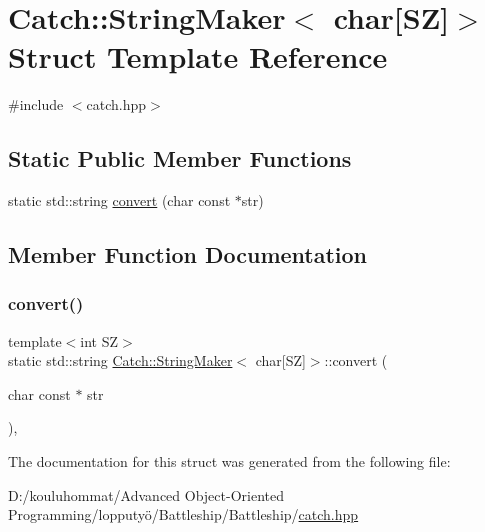 \hypertarget{struct_catch_1_1_string_maker_3_01char[_s_z]_4}{}\section{Catch\+:\+:String\+Maker$<$ char\mbox{[}SZ\mbox{]}$>$ Struct Template Reference}
\label{struct_catch_1_1_string_maker_3_01char[_s_z]_4}


{\ttfamily \#include $<$catch.\+hpp$>$}

\subsection*{Static Public Member Functions}
\begin{DoxyCompactItemize}
\item 
static std\+::string \mbox{\hyperlink{struct_catch_1_1_string_maker_3_01char[_s_z]_4_a095e415534f9145300271befe9853357}{convert}} (char const $\ast$str)
\end{DoxyCompactItemize}


\subsection{Member Function Documentation}
\mbox{\label{struct_catch_1_1_string_maker_3_01char[_s_z]_4_a095e415534f9145300271befe9853357}} 
\subsubsection{\texorpdfstring{convert()}{convert()}}
{\footnotesize\ttfamily template$<$int SZ$>$ \\
static std\+::string \mbox{\hyperlink{struct_catch_1_1_string_maker}{Catch\+::\+String\+Maker}}$<$ char\mbox{[}SZ\mbox{]}$>$\+::convert (\begin{DoxyParamCaption}\item[{char const $\ast$}]{str }\end{DoxyParamCaption})\hspace{0.3cm}{\ttfamily [inline]}, {\ttfamily [static]}}



The documentation for this struct was generated from the following file\+:\begin{DoxyCompactItemize}
\item 
D\+:/kouluhommat/\+Advanced Object-\/\+Oriented Programming/lopputyö/\+Battleship/\+Battleship/\mbox{\hyperlink{catch_8hpp}{catch.\+hpp}}\end{DoxyCompactItemize}
